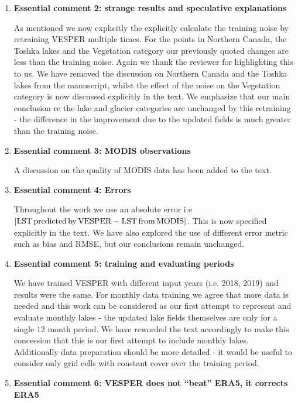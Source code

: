 \documentclass[10pt]{article}
\begin{document}
\begin{enumerate}
	
		\item \textbf{Essential comment 2: strange results and speculative explanations}
		
		As mentioned we now explicitly the explicitly calculate the training noise by retraining VESPER multiple times. For the points in Northern Canada, the Toshka lakes and the Vegetation category our previously quoted changes are less than the training noise. Again we thank the reviewer for highlighting this to us. We have removed the discussion on  Northern Canada and the Toshka lakes from the manuscript, whilst the effect of the noise on the Vegetation category is now discussed explicitly in the text. We emphasize that our main conclusion re the lake and glacier categories are unchanged by this retraining - the difference in the improvement due to the updated fields is much greater than the training noise.
		
		
		
	\item \textbf{Essential comment 3: MODIS observations}
	
	A discussion on the quality of MODIS data has been added to the text. 
	
	
		\item \textbf{Essential comment 4: Errors}
		
	Throughout the work we use an absolute error i.e $ |{\rm LST \, predicted \, by \,  VESPER} - {\rm LST \, from \, MODIS} |$. This is now specified explicitly in the text. We have also explored the use of different error metric such as bias and RMSE, but our conclusions remain unchanged.
	
	 
		\item \textbf{Essential comment 5: training and evaluating periods}
		
		We have trained VESPER with different input years (i.e. 2018, 2019) and results were the same. For monthly data training we agree that more data is needed and this work can be considered as our first attempt to represent and evaluate monthly lakes - the updated lake fields themselves are only for a single 12 month period. We have reworded the text accordingly to make this concession that this is our first attempt to include monthly lakes. Additionally data preparation should be more detailed - it would be useful to consider only grid cells with constant cover over the training period. 
		
		
		\item \textbf{Essential comment 6: VESPER does not “beat” ERA5, it corrects ERA5}
		

\end{enumerate}
\end{document}
